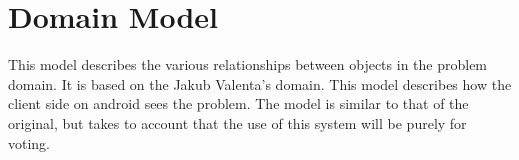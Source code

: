 \documentclass[11pt,twoside,a4paper]{book}
\begin{document}

\section{Domain Model}
This model describes the various relationships between objects in the problem domain. It is based on the Jakub Valenta's domain.
This model describes how the client side on android sees the problem. The model is similar to that of the original, but takes to account that the use of this system will be purely for voting. 
\end{document}
